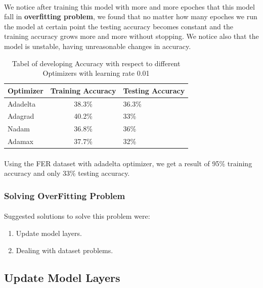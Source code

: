\paragraph{}
We notice after training this model with more and more epoches that this model fall in \textbf{overfitting problem}, we found that no matter how many epoches we run the model at certain point the testing accuracy becomes constant and the training accuracy grows more and more without stopping. We notice also that the model is unstable, having unreasonable changes in accuracy. 
\begin{table}[h!]
	\begin{center}
		\caption{Tabel of developing Accuracy with respect to different Optimizers with learning rate 0.01 \newline}
		\label{tab:optimizers}
		\begin{tabular}{l|c|l}
			\textbf{Optimizer} & \textbf{Training Accuracy} & \textbf{Testing Accuracy}\\ 
			\hline 
			Adadelta & 38.3\% & 36.3\% \\
			Adagrad & 40.2\% & 33\%\\
			Nadam & 36.8\% & 36\% \\
			Adamax & 37.7\% & 32\% \\
		\end{tabular}
	\end{center}
\end{table}
\paragraph{}
Using the FER dataset with adadelta optimizer, we get a result of 95\% training accuracy and only 33\% testing accuracy.
\subsubsection{Solving OverFitting Problem}
\paragraph{} Suggested solutions to solve this problem were:
\begin{enumerate}
	\item Update model layers.
	\item Dealing with dataset problems.
\end{enumerate}
\subsection{Update Model Layers}
